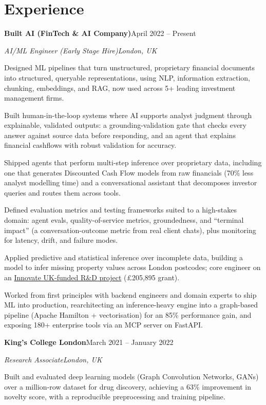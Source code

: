 \documentclass[10pt,a4paper]{article}
\newcommand{\entry}[4]{%
  {\color{company}\bfseries #1}\hfill {\color{muted}#2}\par
  \vspace{1pt}
  {\itshape #3}\hfill {\color{muted}\itshape #4}\par
  \vspace{3pt}%
}
\begin{document}
\section{Experience}
\entry{Built AI (FinTech \& AI Company)}{April 2022 -- Present}{AI/ML Engineer (Early Stage Hire)}{London, UK}
\begin{tight}
  \item Designed ML pipelines that turn unstructured, proprietary financial documents into structured, queryable representations, using NLP, information extraction, chunking, embeddings, and RAG, now used across 5+ leading investment management firms.
  \item Built human-in-the-loop systems where AI supports analyst judgment through explainable, validated outputs: a grounding-validation gate that checks every answer against source data before responding, and an agent that explains financial cashflows with robust validation for accuracy.
  \item Shipped agents that perform multi-step inference over proprietary data, including one that generates Discounted Cash Flow models from raw financials (70\% less analyst modelling time) and a conversational assistant that decomposes investor queries and routes them across tools.
  \item Defined evaluation metrics and testing frameworks suited to a high-stakes domain: agent evals, quality-of-service metrics, groundedness, and ``terminal impact'' (a conversation-outcome metric from real client chats), plus monitoring for latency, drift, and failure modes.
  \item Applied predictive and statistical inference over incomplete data, building a model to infer missing property values across London postcodes; core engineer on an \href{https://gtr.ukri.org/projects?ref=10022996}{Innovate UK-funded R\&D project} (\pounds205,895 grant).
  \item Worked from first principles with backend engineers and domain experts to ship ML into production, rearchitecting an inference-heavy engine into a graph-based pipeline (Apache Hamilton + vectorisation) for an 85\% performance gain, and exposing 180+ enterprise tools via an MCP server on FastAPI.
\end{tight}

\entry{King's College London}{March 2021 -- January 2022}{Research Associate}{London, UK}
\begin{tight}
  \item Built and evaluated deep learning models (Graph Convolution Networks, GANs) over a million-row dataset for drug discovery, achieving a 63\% improvement in novelty score, with a reproducible preprocessing and training pipeline.
\end{tight}
\end{document}
